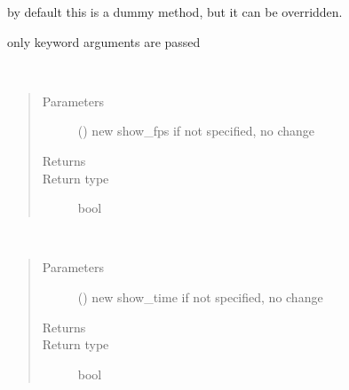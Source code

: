 \documentclass[letterpaper,10pt,english]{sphinxmanual}
\begin{document}
\begin{fulllineitems}
\begin{fulllineitems}
by default this is a dummy method, but it can be overridden.

only keyword arguments are passed

\end{fulllineitems}


\begin{fulllineitems}
\label{\detokenize{Reference:salabim.Environment.show_fps}}~\begin{quote}\begin{description}
\item[{Parameters}] \leavevmode
{} () \textendash{} new show\_fps 
if not specified, no change

\item[{Returns}] \leavevmode
{}

\item[{Return type}] \leavevmode
bool

\end{description}\end{quote}

\end{fulllineitems}


\begin{fulllineitems}
\label{\detokenize{Reference:salabim.Environment.show_time}}~\begin{quote}\begin{description}
\item[{Parameters}] \leavevmode
{} () \textendash{} new show\_time 
if not specified, no change

\item[{Returns}] \leavevmode
{}

\item[{Return type}] \leavevmode
bool

\end{description}\end{quote}

\end{fulllineitems}



\end{fulllineitems}
\end{document}
